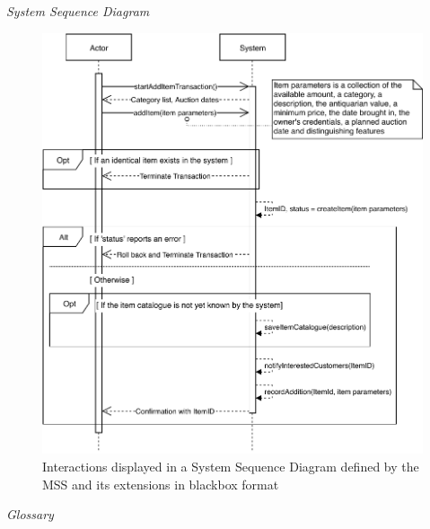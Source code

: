 \textsl{System Sequence Diagram}
\begin{figure}[H]
	\centering
	\includegraphics[scale=1]{uml/SD-bb-create.pdf}
	\caption*{Interactions displayed in a System Sequence Diagram defined by the MSS and its extensions in blackbox format}
\end{figure}
\newpage
\textsl{Glossary}
